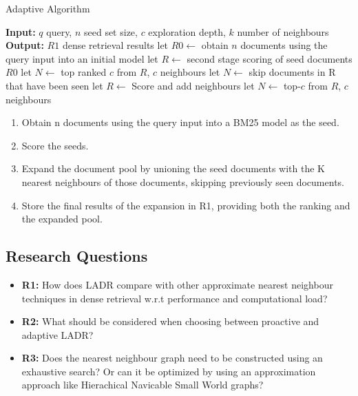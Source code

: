 \documentclass[sigconf,authorversion,nonacm]{acmart}
\begin{document}
\begin{algorithm}
	\caption{Adaptive Algorithm}
	\begin{algorithmic}[1]
		\STATE \textbf{Input:} \( q \) query, \( n \) seed set size, \( c \) exploration depth, \( k
		\) number of neighbours
		\STATE \textbf{Output:} \( R1 \) dense retrieval results
		\STATE let \( R0 \leftarrow \) obtain \( n \) documents using the query input into an initial model
		\STATE let \( R \leftarrow \) second stage scoring of seed documents \(R0\)
		\STATE let \( N \leftarrow\) top ranked \( c  \) from \(R \), \(c \) neighbours
		\STATE let \( N \leftarrow\) skip documents in R that have been seen
		\STATE let \( R \leftarrow \) Score and add neighbours
		\STATE let \( N \leftarrow\) top-\( c  \) from \(R \), \(c \) neighbours
		\ENDWHILE
	\end{algorithmic}
\end{algorithm}

\begin{enumerate}

	\item Obtain n documents using the query input into a BM25 model as the seed.

	\item Score the seeds.

	\item Expand the document pool by unioning the seed documents with the K nearest neighbours of
	      those documents, skipping previously seen documents.

	\item Store the final results of the expansion in R1, providing both the ranking and the
	      expanded pool.

\end{enumerate}

\subsection{Research Questions}

\begin{itemize}

	\item \textbf{R1:} How does LADR compare with other approximate nearest neighbour techniques in
	      dense retrieval w.r.t performance and computational load?

	\item \textbf{R2:} What should be considered when choosing between proactive and adaptive LADR?

	\item \textbf{R3:} Does the nearest neighbour graph need to be constructed using an exhaustive
	      search? Or can it be optimized by using an approximation approach like Hierachical
	      Navicable Small World graphs?\cite{hnsw}

\end{itemize}
\end{document}
